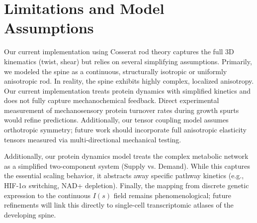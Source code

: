 \section{Limitations and Model Assumptions}
Our current implementation using Cosserat rod theory captures the full 3D kinematics (twist, shear) but relies on several simplifying assumptions. Primarily, we modeled the spine as a continuous, structurally isotropic or uniformly anisotropic rod. In reality, the spine exhibits highly complex, localized anisotropy. Our current implementation treats protein dynamics with simplified kinetics and does not fully capture mechanochemical feedback. Direct experimental measurement of mechanosensory protein turnover rates during growth spurts would refine predictions. Additionally, our tensor coupling model assumes orthotropic symmetry; future work should incorporate full anisotropic elasticity tensors measured via multi-directional mechanical testing.

Additionally, our protein dynamics model treats the complex metabolic network as a simplified two-component system (Supply vs. Demand). While this captures the essential scaling behavior, it abstracts away specific pathway kinetics (e.g., HIF-1$\alpha$ switching, NAD+ depletion). Finally, the mapping from discrete genetic expression to the continuous $I(s)$ field remains phenomenological; future refinements will link this directly to single-cell transcriptomic atlases of the developing spine.

